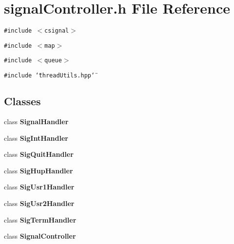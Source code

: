 \section{signal\-Controller.h File Reference}
\label{signalController_8h}
{\tt \#include $<$csignal$>$}\par
{\tt \#include $<$map$>$}\par
{\tt \#include $<$queue$>$}\par
{\tt \#include \char`\"{}thread\-Utils.hpp\char`\"{}}\par
\subsection*{Classes}
\begin{CompactItemize}
\item 
class {\bf Signal\-Handler}
\item 
class {\bf Sig\-Int\-Handler}
\item 
class {\bf Sig\-Quit\-Handler}
\item 
class {\bf Sig\-Hup\-Handler}
\item 
class {\bf Sig\-Usr1Handler}
\item 
class {\bf Sig\-Usr2Handler}
\item 
class {\bf Sig\-Term\-Handler}
\item 
class {\bf Signal\-Controller}
\end{CompactItemize}
